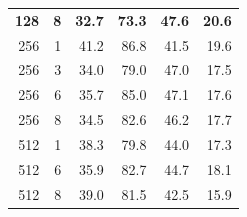 \documentclass[12pt,oneside]{book} %
\begin{document}
\begin{table}[H]
\begin{adjustbox}{width=0.8\textwidth}
\begin{tabular}{rrrrrr}
            \textbf{128}         & \textbf{8}            & \textbf{32.7}      & \textbf{73.3}      & \textbf{47.6}      & \textbf{20.6}      \\
            256                  & 1                     & 41.2               & 86.8               & 41.5               & 19.6               \\
            256                  & 3                     & 34.0               & 79.0               & 47.0               & 17.5               \\
            256                  & 6                     & 35.7               & 85.0               & 47.1               & 17.6               \\
            256                  & 8                     & 34.5               & 82.6               & 46.2               & 17.7               \\
            512                  & 1                     & 38.3               & 79.8               & 44.0               & 17.3               \\
            512                  & 6                     & 35.9               & 82.7               & 44.7               & 18.1               \\
            512                  & 8                     & 39.0               & 81.5               & 42.5               & 15.9               \\
            \bottomrule
        \end{tabular}
    \end{adjustbox}
    \label{tab:vel-metrics-rounded}
\end{table}
\end{document}
